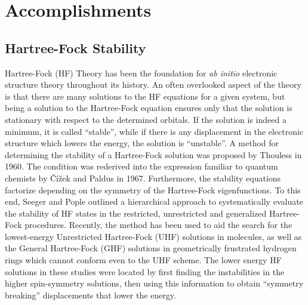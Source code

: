 \documentclass{revtex4}
\begin{document}
    
\newpage

\section{Accomplishments}

   
   \subsection{Hartree-Fock Stability}
    Hartree-Fock (HF) Theory has been the foundation for \emph{ab initio} electronic structure 
    theory 
    throughout its history. An often overlooked aspect of the theory is that there are many 
    solutions to the HF equations for a given system, but being a 
    solution to the Hartree-Fock equation ensures only that the solution is stationary with respect 
    to the 
    determined orbitals. If the solution is indeed a minimum, it is called ``stable'', while if 
    there 
    is any displacement in the electronic structure which lowers the energy, the solution is 
    ``unstable''. A method for determining the stability of a Hartree-Fock solution was 
    proposed by Thouless in 1960\cite{Thouless1960}. The condition was rederived into the 
    expression familiar to quantum chemists by Čížek and Paldus in 1967\cite{Cizek1967}. 
    Furthermore, the stability equations factorize depending on the symmetry of the Hartree-Fock 
    eigenfunctions. To this end, Seeger and Pople outlined a hierarchical approach to 
    systematically evaluate the stability of HF states in the restricted, unrestricted and 
    generalized Hartree-Fock procedures\cite{Seeger1977}. Recently, the method has been used to aid 
    the search for the lowest-energy Unrestricted Hartree-Fock (UHF) solutions in molecules, as 
    well as the General Hartree-Fock (GHF) solutions in geometrically frustrated hydrogen rings 
    which cannot conform even to the UHF scheme\cite{Pulay2016, Goings2015}. The lower energy HF 
    solutions in these studies were located by first finding the instabilities in the higher 
    spin-symmetry solutions, then using this information to obtain ``symmetry breaking'' 
    displacements that lower the energy.
    
\end{document}
